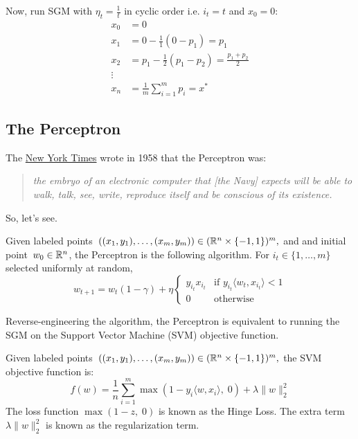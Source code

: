 Now, run SGM with $\eta_t=\frac{1}{t}$ in cyclic order i.e. $i_t = t$ and $x_0=0$:
\begin{align*}
    x_0 &= 0 \\
    x_1 &= 0 - \frac{1}{1}(0-p_1) = p_1 \\
    x_2 &= p_1 - \frac{1}{2}(p_1-p_2) = \frac{p_1+p_2}{2}\\
    \vdots\\
    x_n &= \frac{1}{m}\sum_{i=1}^mp_i = x^*
\end{align*}

\subsection{The Perceptron}

The
\href{https://www.nytimes.com/1958/07/08/archives/new-navy-device-learns-by-doing-psychologist-shows-embryo-of.html}{New
York Times} wrote in 1958 that the Perceptron \cite{Rosenblatt58theperceptron:}
was:
\begin{quote}
\emph{the embryo of an electronic computer that [the Navy] expects will be able
to walk, talk, see, write, reproduce itself and be conscious of its existence.}
\end{quote}

So, let's see.

\begin{definition}[Perceptron] 
Given labeled points~$((x_1, y_1),\dots,(x_m,y_m))\in(\mathbb{R}^n\times\{-1,1\})^m,$ 
and and initial point~$w_0\in\mathbb{R}^n$, the Perceptron is the following algorithm. 
For $i_t\in\{1,\dots,m\}$ selected uniformly at random,
\begin{equation*}
w_{t+1} =w_t(1-\gamma) + \eta \begin{cases}
    y_{i_t}x_{i_t}& \text{if } y_{i_t}\langle w_t, x_{i_t}\rangle <1\\
    0              & \text{otherwise}
\end{cases}
\end{equation*}
\end{definition}

Reverse-engineering the algorithm, the Perceptron is equivalent to running the
SGM on the Support Vector Machine (SVM) objective function.

\begin{definition}[SVM] 

Given labeled points~$((x_1, y_1),\dots,(x_m,y_m))\in(\mathbb{R}^n\times\{-1,1\})^m,$ 
the SVM objective function is:
\begin{equation*}
    f(w) = \frac{1}{n}\sum_{i=1}^m \max(1-y_i\langle w, x_i\rangle,\; 0) + \lambda \|w\|_2^2
\end{equation*}
The loss function $\max(1-z,\;0)$ is known as the Hinge Loss. The extra 
term~$\lambda \|w\|_2^2$ is known as the regularization term.
\end{definition}

